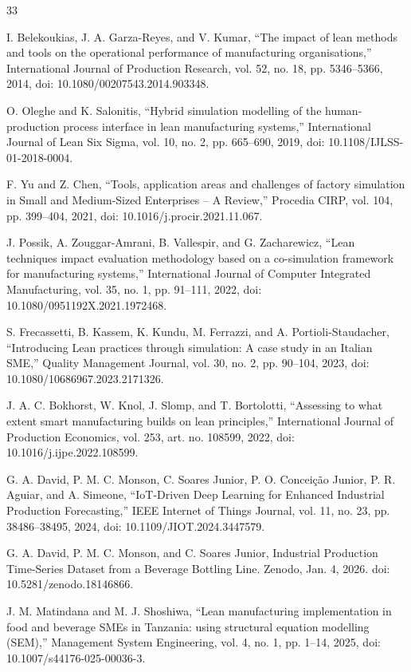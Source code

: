 \documentclass[12pt,a4paper]{article}
\begin{document}
\begin{thebibliography}{33}

I. Belekoukias, J. A. Garza-Reyes, and V. Kumar, ``The impact of lean methods and tools on the operational performance of manufacturing organisations,'' International Journal of Production Research, vol. 52, no. 18, pp. 5346--5366, 2014, doi: 10.1080/00207543.2014.903348.

O. Oleghe and K. Salonitis, ``Hybrid simulation modelling of the human-production process interface in lean manufacturing systems,'' International Journal of Lean Six Sigma, vol. 10, no. 2, pp. 665--690, 2019, doi: 10.1108/IJLSS-01-2018-0004.

F. Yu and Z. Chen, ``Tools, application areas and challenges of factory simulation in Small and Medium-Sized Enterprises -- A Review,'' Procedia CIRP, vol. 104, pp. 399--404, 2021, doi: 10.1016/j.procir.2021.11.067.

J. Possik, A. Zouggar-Amrani, B. Vallespir, and G. Zacharewicz, ``Lean techniques impact evaluation methodology based on a co-simulation framework for manufacturing systems,'' International Journal of Computer Integrated Manufacturing, vol. 35, no. 1, pp. 91--111, 2022, doi: 10.1080/0951192X.2021.1972468.

S. Frecassetti, B. Kassem, K. Kundu, M. Ferrazzi, and A. Portioli-Staudacher, ``Introducing Lean practices through simulation: A case study in an Italian SME,'' Quality Management Journal, vol. 30, no. 2, pp. 90--104, 2023, doi: 10.1080/10686967.2023.2171326.

J. A. C. Bokhorst, W. Knol, J. Slomp, and T. Bortolotti, ``Assessing to what extent smart manufacturing builds on lean principles,'' International Journal of Production Economics, vol. 253, art. no. 108599, 2022, doi: 10.1016/j.ijpe.2022.108599.

G. A. David, P. M. C. Monson, C. Soares Junior, P. O. Concei\c{c}\~ao Junior, P. R. Aguiar, and A. Simeone, ``IoT-Driven Deep Learning for Enhanced Industrial Production Forecasting,'' IEEE Internet of Things Journal, vol. 11, no. 23, pp. 38486--38495, 2024, doi: 10.1109/JIOT.2024.3447579.

G. A. David, P. M. C. Monson, and C. Soares Junior, Industrial Production Time-Series Dataset from a Beverage Bottling Line. Zenodo, Jan. 4, 2026. doi: 10.5281/zenodo.18146866.

J. M. Matindana and M. J. Shoshiwa, ``Lean manufacturing implementation in food and beverage SMEs in Tanzania: using structural equation modelling (SEM),'' Management System Engineering, vol. 4, no. 1, pp. 1--14, 2025, doi: 10.1007/s44176-025-00036-3.


\end{thebibliography}
\end{document}
